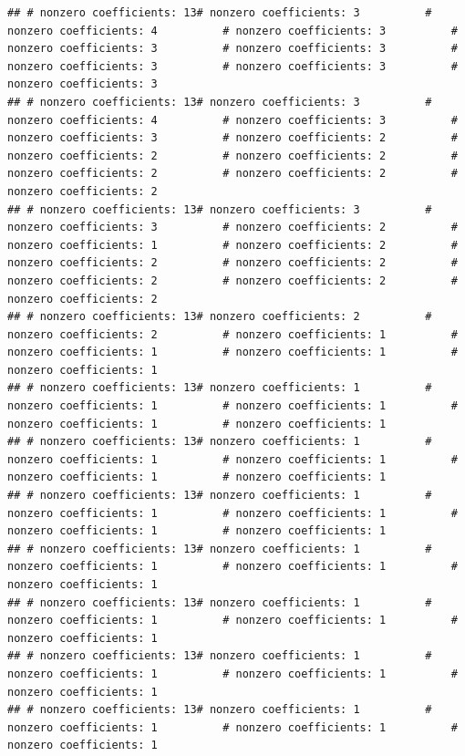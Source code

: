\documentclass[
]{article}
\begin{document}
\begin{verbatim}
## # nonzero coefficients: 13# nonzero coefficients: 3          # nonzero coefficients: 4          # nonzero coefficients: 3          # nonzero coefficients: 3          # nonzero coefficients: 3          # nonzero coefficients: 3          # nonzero coefficients: 3          # nonzero coefficients: 3          
## # nonzero coefficients: 13# nonzero coefficients: 3          # nonzero coefficients: 4          # nonzero coefficients: 3          # nonzero coefficients: 3          # nonzero coefficients: 2          # nonzero coefficients: 2          # nonzero coefficients: 2          # nonzero coefficients: 2          # nonzero coefficients: 2          # nonzero coefficients: 2          
## # nonzero coefficients: 13# nonzero coefficients: 3          # nonzero coefficients: 3          # nonzero coefficients: 2          # nonzero coefficients: 1          # nonzero coefficients: 2          # nonzero coefficients: 2          # nonzero coefficients: 2          # nonzero coefficients: 2          # nonzero coefficients: 2          # nonzero coefficients: 2          
## # nonzero coefficients: 13# nonzero coefficients: 2          # nonzero coefficients: 2          # nonzero coefficients: 1          # nonzero coefficients: 1          # nonzero coefficients: 1          # nonzero coefficients: 1          
## # nonzero coefficients: 13# nonzero coefficients: 1          # nonzero coefficients: 1          # nonzero coefficients: 1          # nonzero coefficients: 1          # nonzero coefficients: 1          
## # nonzero coefficients: 13# nonzero coefficients: 1          # nonzero coefficients: 1          # nonzero coefficients: 1          # nonzero coefficients: 1          # nonzero coefficients: 1          
## # nonzero coefficients: 13# nonzero coefficients: 1          # nonzero coefficients: 1          # nonzero coefficients: 1          # nonzero coefficients: 1          # nonzero coefficients: 1          
## # nonzero coefficients: 13# nonzero coefficients: 1          # nonzero coefficients: 1          # nonzero coefficients: 1          # nonzero coefficients: 1          
## # nonzero coefficients: 13# nonzero coefficients: 1          # nonzero coefficients: 1          # nonzero coefficients: 1          # nonzero coefficients: 1          
## # nonzero coefficients: 13# nonzero coefficients: 1          # nonzero coefficients: 1          # nonzero coefficients: 1          # nonzero coefficients: 1          
## # nonzero coefficients: 13# nonzero coefficients: 1          # nonzero coefficients: 1          # nonzero coefficients: 1          # nonzero coefficients: 1          

\end{verbatim}
\end{document}
